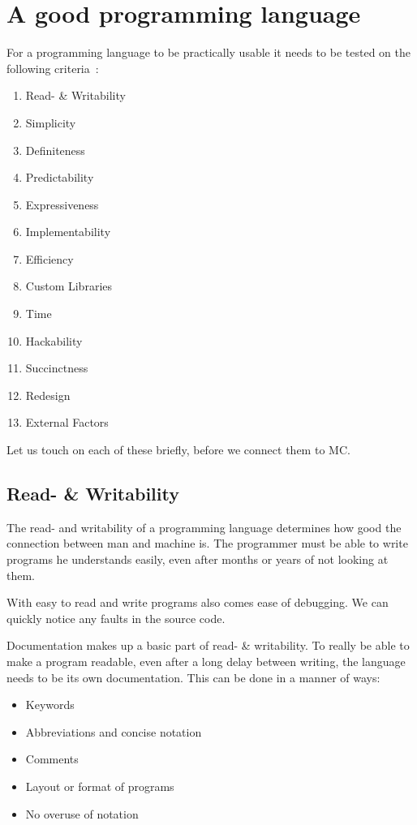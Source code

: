 \chapter{A good programming language}\label{chap:criteria}
For a programming language to be practically usable it needs to be tested on the following criteria~\cite{khedker1997makes,graham2004hackers}:

\begin{multicols}{2}
   \begin{enumerate}[noitemsep]
      \item Read- \& Writability
      \item Simplicity
      \item Definiteness
      \item Predictability
      \item Expressiveness
      \item Implementability
      \item Efficiency
      \item Custom Libraries
      \item Time
      \item Hackability
      \item Succinctness
      \item Redesign
      \item External Factors
   \end{enumerate}
\end{multicols}
Let us touch on each of these briefly, before we connect them to MC.

\section{Read- \& Writability }
The read- and writability of a programming language determines how good the connection between man and machine is.
The programmer must be able to write programs he understands easily, even after months or years of not looking at them.

With easy to read and write programs also comes ease of debugging.
We can quickly notice any faults in the source code.

Documentation makes up a basic part of read- \& writability.
To really be able to make a program readable, even after a long delay between writing, the language needs to be its own documentation.
This can be done in a manner of ways:
\begin{itemize}[noitemsep]
   \item Keywords
   \item Abbreviations and concise notation
   \item Comments
   \item Layout or format of programs
   \item No overuse of notation
\end{itemize}

